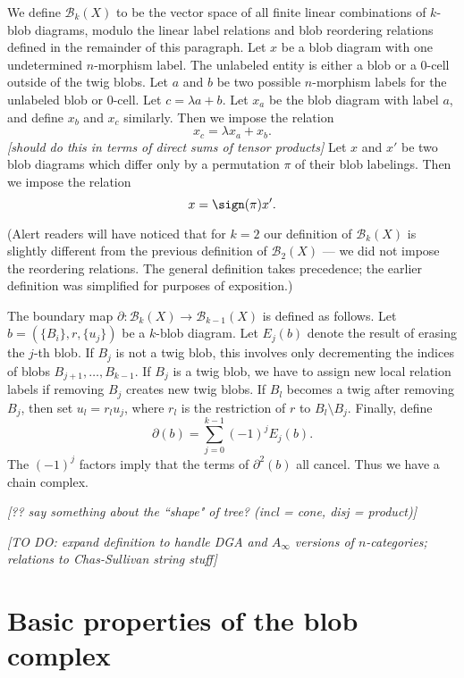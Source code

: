 \documentclass[11pt,leqno]{amsart}
\def\bc{{\mathcal B}}
\def\bd{\partial}
\def\setmin{\setminus}
\def\nn#1{{{\it \small [#1]}}}
\newcommand{\eq}[1]{\begin{displaymath}#1\end{displaymath}}
\begin{document}
We define $\bc_k(X)$ to be the vector space of all finite linear combinations
of $k$-blob diagrams, modulo the linear label relations and
blob reordering relations defined in the remainder of this paragraph.
Let $x$ be a blob diagram with one undetermined $n$-morphism label.
The unlabeled entity is either a blob or a 0-cell outside of the twig blobs.
Let $a$ and $b$ be two possible $n$-morphism labels for
the unlabeled blob or 0-cell.
Let $c = \lambda a + b$.
Let $x_a$ be the blob diagram with label $a$, and define $x_b$ and $x_c$ similarly.
Then we impose the relation
\eq{
    x_c = \lambda x_a + x_b .
}
\nn{should do this in terms of direct sums of tensor products}
Let $x$ and $x'$ be two blob diagrams which differ only by a permutation $\pi$
of their blob labelings.
Then we impose the relation
\eq{
    x = \sign(\pi) x' .
}

(Alert readers will have noticed that for $k=2$ our definition
of $\bc_k(X)$ is slightly different from the previous definition
of $\bc_2(X)$ --- we did not impose the reordering relations.
The general definition takes precedence;
the earlier definition was simplified for purposes of exposition.)

The boundary map $\bd : \bc_k(X) \to \bc_{k-1}(X)$ is defined as follows.
Let $b = (\{B_i\}, r, \{u_j\})$ be a $k$-blob diagram.
Let $E_j(b)$ denote the result of erasing the $j$-th blob.
If $B_j$ is not a twig blob, this involves only decrementing
the indices of blobs $B_{j+1},\ldots,B_{k-1}$.
If $B_j$ is a twig blob, we have to assign new local relation labels
if removing $B_j$ creates new twig blobs.
If $B_l$ becomes a twig after removing $B_j$, then set $u_l = r_lu_j$,
where $r_l$ is the restriction of $r$ to $B_l \setmin B_j$.
Finally, define
\eq{
    \bd(b) = \sum_{j=0}^{k-1} (-1)^j E_j(b).
}
The $(-1)^j$ factors imply that the terms of $\bd^2(b)$ all cancel.
Thus we have a chain complex.

\nn{?? say something about the ``shape" of tree? (incl = cone, disj = product)}


\nn{TO DO:
expand definition to handle DGA and $A_\infty$ versions of $n$-categories;
relations to Chas-Sullivan string stuff}



\section{Basic properties of the blob complex}
\label{sec:basic-properties}
\end{document}
